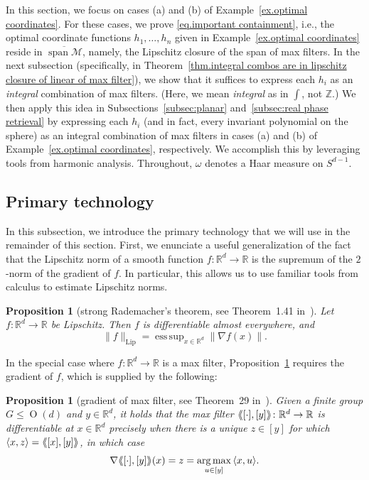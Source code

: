 \documentclass{article}
\theoremstyle{plain}
\newtheorem{proposition}[theorem]{Proposition}
\theoremstyle{definition}
\newcommand{\llangle}{\langle\hspace{-2.5pt}\langle}
\newcommand{\rrangle}{\rangle\hspace{-2.5pt}\rangle}
\DeclareMathOperator*{\esssup}{ess\,sup}
\DeclareMathOperator*{\argmax}{arg\,max}
\begin{document}
In this section, we focus on cases (a) and (b) of Example~\ref{ex.optimal coordinates}.
For these cases, we prove \eqref{eq.important containment}, i.e., the optimal coordinate functions $h_1,\ldots,h_n$ given in Example~\ref{ex.optimal coordinates} reside in $\overline{\operatorname{span}\mathcal{M}}$, namely, the Lipschitz closure of the span of max filters.
In the next subsection (specifically, in Theorem~\ref{thm.integral combos are in lipschitz closure of linear of max filter}), we show that it suffices to express each $h_i$ as an \textit{integral} combination of max filters.
(Here, we mean \textit{integral} as in $\int$, not $\mathbb{Z}$.)
We then apply this idea in Subsections~\ref{subsec:planar} and~\ref{subsec:real phase retrieval} by expressing each $h_i$ (and in fact, every invariant polynomial on the sphere) as an integral combination of max filters in cases (a) and (b) of Example~\ref{ex.optimal coordinates}, respectively.
We accomplish this by leveraging tools from harmonic analysis.
Throughout, $\omega$ denotes a Haar measure on $S^{d-1}$.

\subsection{Primary technology}

In this subsection, we introduce the primary technology that we will use in the remainder of this section.
First, we enunciate a useful generalization of the fact that the Lipschitz norm of a smooth function $f\colon\mathbb{R}^d\to\mathbb{R}$ is the supremum of the $2$-norm of the gradient of $f$.
In particular, this allows us to use familiar tools from calculus to estimate Lipschitz norms.

\begin{proposition}[strong Rademacher's theorem, see Theorem~1.41 in~\cite{Weaver:18}]
\label{prop.rademacher}
Let $f\colon\mathbb{R}^d\to\mathbb{R}$ be Lipschitz.
Then $f$ is differentiable almost everywhere, and
\[
\|f\|_{\operatorname{Lip}}
=\esssup_{x\in\mathbb{R}^d}\|\nabla f(x)\|.
\]
\end{proposition}

In the special case where $f\colon\mathbb{R}^d\to\mathbb{R}$ is a max filter, Proposition~\ref{prop.rademacher} requires the gradient of $f$, which is supplied by the following:

\begin{proposition}[gradient of max filter, see Theorem~29 in~\cite{CahillIM:24}]
\label{prop.grad max filter}
Given a finite group $G\leq\operatorname{O}(d)$ and $y\in\mathbb{R}^d$, it holds that the max filter $\llangle [\cdot],[y]\rrangle\colon\mathbb{R}^d\to\mathbb{R}$ is differentiable at $x\in\mathbb{R}^d$ precisely when there is a unique $z\in[y]$ for which $\langle x,z\rangle=\llangle [x],[y]\rrangle$, in which case 
\[
\nabla\llangle [\cdot],[y]\rrangle(x)
=z
=\argmax_{u\in [y]}\,\langle x,u\rangle.
\]
\end{proposition}
\end{document}
